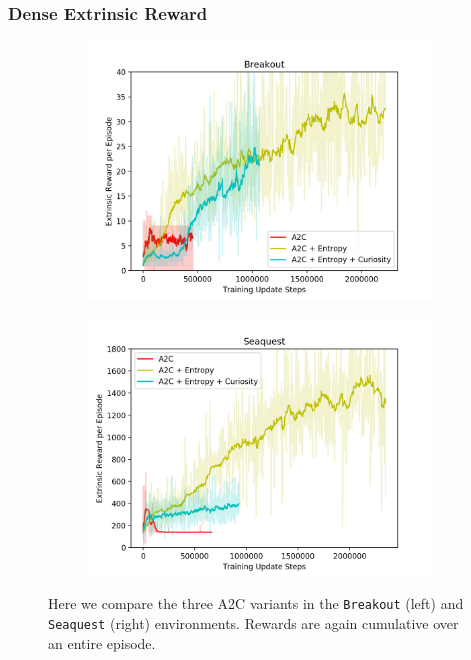 \documentclass{article}
\begin{document}
\subsubsection{Dense Extrinsic Reward}
\begin{figure}
\centering
\begin{subfigure}{.5\textwidth}
  \centering
  \includegraphics[width=1.\linewidth]{figures/breakout_rewards}
\end{subfigure}%
\begin{subfigure}{.5\textwidth}
  \centering
  \includegraphics[width=1.\linewidth]{figures/seaquest_rewards}
\end{subfigure}
\caption{Here we compare the three A2C variants in the \texttt{Breakout} (left) and \texttt{Seaquest} (right) environments. Rewards are again cumulative over an entire episode.}
\label{fig:seaquest-breakout-reward}
\end{figure}
\end{document}
